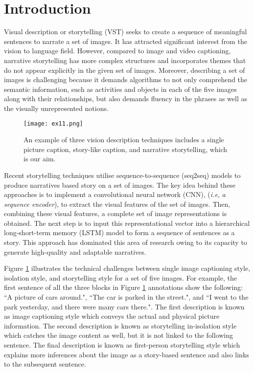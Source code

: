\documentclass[runningheads]{llncs}
\begin{document}
\section{Introduction}
Visual description or storytelling (VST) seeks to create a sequence of meaningful sentences to narrate a set of images. It has attracted significant interest from the vision to language field. However, compared to image \cite{li2022comprehending,fei2022deecap} and video \cite{pan2020spatio,seo2022end,lin2022swinbert} captioning, narrative storytelling \cite{9647213,kim2018glac,Liu_Fu_Mei_Chen_2017} has more complex structures and incorporates themes that do not appear explicitly in the given set of images. Moreover, describing a set of images is challenging because it demands algorithms to not only comprehend the semantic information, such as activities and objects in each of the five images along with their relationships, but also demands fluency in the phrases as well as the visually unrepresented notions.

\begin{figure}
\texttt{[image: ex11.png]}
\caption{An example of three vision description techniques includes a single picture caption, story-like caption, and narrative storytelling, which is our aim.} \label{fig1}
\end{figure}


Recent storytelling techniques utilise sequence-to-sequence (seq2seq) models \cite{visapp21,kim2018glac} to produce narratives based story on a set of images. The key idea behind these approaches is to implement a convolutional neural network (CNN), (\emph{i.e}, {\em a sequence encoder}), to extract the visual features of the set of images. Then, combining these visual features, a complete set of image representations is obtained. The next step is to input this representational vector into a hierarchical long-short-term memory (LSTM) model to form a sequence of sentences as a story. This approach has dominated this area of research owing to its capacity to generate high-quality and adaptable narratives.


Figure \ref{fig1} illustrates the technical challenges between single image captioning style, isolation style, and storytelling style for a set of five images. For example, the first sentence of all the three blocks in Figure \ref{fig1} annotations show the following: ``A picture of cars around.", ``The car is parked in the street.", and ``I went to the park yesterday, and there were many cars there.". The first description is known as image captioning style which conveys the actual and physical picture information. The second description is known as storytelling in-isolation style which catches the image content as well, but it is not linked to the following sentence. The final description is known as first-person storytelling style which explains more inferences about the image as a story-based sentence and also links to the subsequent sentence.
\end{document}
